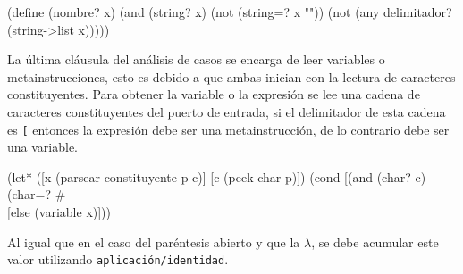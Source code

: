 \nwenddocs{}\plusendmoddef
(define (nombre? x)
  (and (string? x)
       (not (string=? x ""))
       (not (any delimitador? (string->list x)))))

\eatline
{}\nwendcode{}\nwdocspar

La última cláusula del análisis de casos se encarga de leer variables o metainstrucciones, esto es debido a que ambas inician con la lectura de caracteres constituyentes. Para obtener la variable o la expresión se lee una cadena de caracteres constituyentes del puerto de entrada, si el delimitador de esta cadena es {\tt{}{}{}[} entonces la expresión debe ser una metainstrucción, de lo contrario debe ser una variable.

\nwenddocs{}\endmoddef
(let* ([x (parsear-constituyente p c)]
       [c (peek-char p)])
  (cond [(and (char? c) (char=? #\\[ c))
         (read-char p)
         (metainstrucción x (parsear-corchetes p))]
        [else
         (variable x)]))
\nwendcode{}\nwdocspar

Al igual que en el caso del paréntesis abierto y que la \( λ \), se debe acumular este valor utilizando {\tt{}\protect{}aplicación\protect{}/identidad}.

